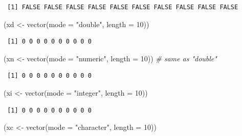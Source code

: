 \documentclass[
]{book}
\newenvironment{Shaded}{\begin{snugshade}}{\end{snugshade}}
\newcommand{\AttributeTok}[1]{\textcolor[rgb]{0.77,0.63,0.00}{#1}}
\newcommand{\CommentTok}[1]{\textcolor[rgb]{0.56,0.35,0.01}{\textit{#1}}}
\newcommand{\DecValTok}[1]{\textcolor[rgb]{0.00,0.00,0.81}{#1}}
\newcommand{\FunctionTok}[1]{\textcolor[rgb]{0.00,0.00,0.00}{#1}}
\newcommand{\NormalTok}[1]{#1}
\newcommand{\OtherTok}[1]{\textcolor[rgb]{0.56,0.35,0.01}{#1}}
\newcommand{\StringTok}[1]{\textcolor[rgb]{0.31,0.60,0.02}{#1}}
\begin{document}
\begin{verbatim}
 [1] FALSE FALSE FALSE FALSE FALSE FALSE FALSE FALSE FALSE FALSE
\end{verbatim}

\begin{Shaded}
\begin{Highlighting}[]
\NormalTok{(xd }\OtherTok{\textless{}{-}} \FunctionTok{vector}\NormalTok{(}\AttributeTok{mode =} \StringTok{"double"}\NormalTok{, }\AttributeTok{length =} \DecValTok{10}\NormalTok{))}
\end{Highlighting}
\end{Shaded}

\begin{verbatim}
 [1] 0 0 0 0 0 0 0 0 0 0
\end{verbatim}

\begin{Shaded}
\begin{Highlighting}[]
\NormalTok{(xn }\OtherTok{\textless{}{-}} \FunctionTok{vector}\NormalTok{(}\AttributeTok{mode =} \StringTok{"numeric"}\NormalTok{, }\AttributeTok{length =} \DecValTok{10}\NormalTok{)) }\CommentTok{\# same as "double"}
\end{Highlighting}
\end{Shaded}

\begin{verbatim}
 [1] 0 0 0 0 0 0 0 0 0 0
\end{verbatim}

\begin{Shaded}
\begin{Highlighting}[]
\NormalTok{(xi }\OtherTok{\textless{}{-}} \FunctionTok{vector}\NormalTok{(}\AttributeTok{mode =} \StringTok{"integer"}\NormalTok{, }\AttributeTok{length =} \DecValTok{10}\NormalTok{))}
\end{Highlighting}
\end{Shaded}

\begin{verbatim}
 [1] 0 0 0 0 0 0 0 0 0 0
\end{verbatim}

\begin{Shaded}
\begin{Highlighting}[]
\NormalTok{(xc }\OtherTok{\textless{}{-}} \FunctionTok{vector}\NormalTok{(}\AttributeTok{mode =} \StringTok{"character"}\NormalTok{, }\AttributeTok{length =} \DecValTok{10}\NormalTok{))}
\end{Highlighting}
\end{Shaded}
\end{document}
